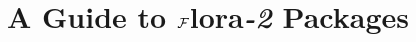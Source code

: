 \documentclass[11pt]{report}
\begin{document}
\newcommand{\FLORA}{{\mbox{\sc ${\cal F}${lora}\rm\emph{-2}}}\xspace}
\newcommand{\fl}{F-logic }

\newcommand{\fd}{{\mbox{\tt \,->\,}}}                   %
\newcommand{\bfd}{{\mbox{\tt \,*->\,}}}            %
\newcommand{\mvd}{{\mbox{\tt \,->\,}}}  %
\newcommand{\bmvd}{{\mbox{\tt \,*->\,}}}              %
\newcommand{\Fd}{{\mbox{\tt \,=>\,}}}                      %
\newcommand{\Mvd}{{\mbox{\tt \,=>\,}}}  %
\newcommand{\bFd}{{\mbox{\tt \,*=>\,}}}                      %
\newcommand{\bMvd}{{\mbox{\tt \,*=>\,}}}  %
\newcommand{\thismodule}{{\tt \_@}\xspace}

\def\Protege{Prot\'{e}g\'{e} }
\def\NoProtege{Prot\'{e}g\'{e}}

\title{\bf A Guide to \FLORA Packages}


\maketitle


\thispagestyle{empty}
\newpage
\thispagestyle{empty}

\tableofcontents
\newpage        %
  





\end{document}
